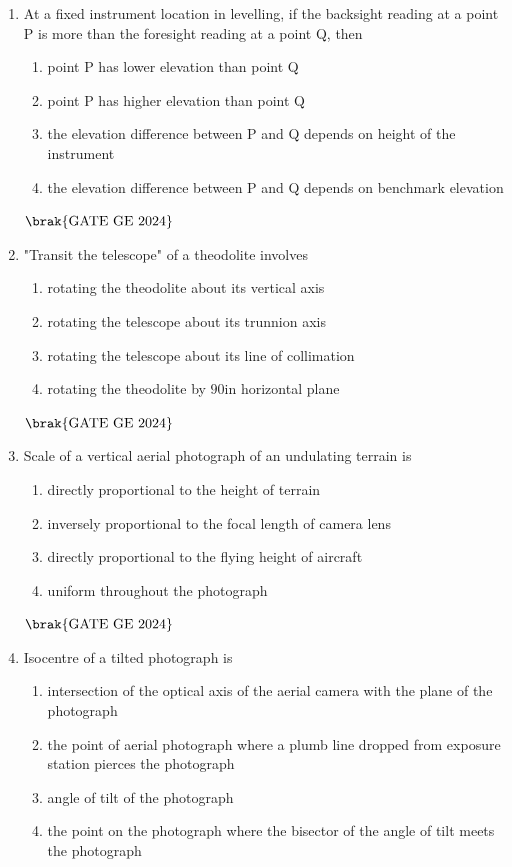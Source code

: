 \documentclass[journal,12pt,onecolumn]{IEEEtran}
\theoremstyle{remark}
\begin{document}
\begin{enumerate}
\bigskip
\item At a fixed instrument location in levelling, if the backsight reading at a point 
P is more than the foresight reading at a point Q, then
\begin{enumerate}
\item point P has lower elevation than point Q
\item point P has higher elevation than point Q
\item the elevation difference between P and Q depends on height of the instrument
\item the elevation difference between P and Q depends on benchmark elevation
\end{enumerate}
\hfill $\brak{\text{GATE GE 2024}}$
\bigskip
\item "Transit the telescope" of a theodolite involves
\begin{enumerate}
\item rotating the theodolite about its vertical axis
\item rotating the telescope about its trunnion axis
\item rotating the telescope about its line of collimation
\item rotating the theodolite by $90$\degree in horizontal plane
\end{enumerate}
\hfill $\brak{\text{GATE GE 2024}}$
\bigskip
\item Scale of a vertical aerial photograph of 
an undulating terrain is
\begin{enumerate}
\item directly proportional to the height of terrain
\item inversely proportional to the focal length of camera lens
\item directly proportional to the flying height of aircraft
\item uniform throughout the photograph
\end{enumerate}
\hfill $\brak{\text{GATE GE 2024}}$
\bigskip
\item Isocentre of a tilted photograph is
\begin{enumerate}
\item intersection of the optical axis of the aerial camera with the plane of the photograph
\item the point of aerial photograph where a plumb line dropped from exposure station pierces the photograph
\item angle of tilt of the photograph
\item the point on the photograph where the bisector of the angle of tilt meets the photograph
\end{enumerate}
\end{enumerate}
\end{document}
